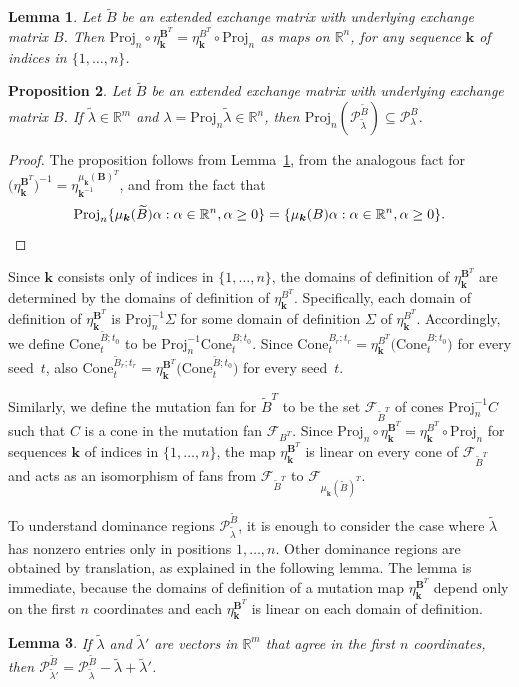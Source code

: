 \documentclass[10pt]{article}
\newtheorem{proposition}{Proposition}[section]
\newtheorem{lemma}[proposition]{Lemma}
\theoremstyle{definition}
\theoremstyle{remark}
\numberwithin{equation}{section}
\newcommand{\reals}{\mathbb R}
\newcommand{\set}[1]{{\lbrace #1 \rbrace}}
\newcommand{\GG}{{\mathbf G}}
\newcommand{\F}{{\mathcal F}}
\newcommand{\0}{{\mathbf{0}}}
\newcommand{\Cone}{\mathrm{Cone}}
\newcommand{\Proj}{\mathrm{Proj}}
\newcommand{\kk}{{\boldsymbol{k}}}
\newcommand{\tB}{{\widetilde{B}}}
\newcommand{\BB}{\mathbf{B}}
\renewcommand{\P}{\mathcal{P}}
\begin{document}
\begin{lemma}\label{eta proj}
Let $\tB$ be an extended exchange matrix with underlying exchange matrix $B$.
Then $\Proj_n\circ\eta_\kk^{\BB^T}=\eta_\kk^{B^T}\circ\Proj_n$ as maps on $\reals^n$, for any sequence $\kk$ of indices in $\set{1,\ldots,n}$.
\end{lemma}

\begin{proposition}\label{contains proj}
Let $\tB$ be an extended exchange matrix with underlying exchange matrix $B$.
  If $\tilde\lambda\in\reals^m$ and $\lambda=\Proj_n\tilde\lambda\in\reals^n$, then $\Proj_n(\P_{\tilde\lambda}^\tB)\subseteq\P_{\lambda}^B$.
\end{proposition}
\begin{proof}
The proposition follows from Lemma~\ref{eta proj}, from the analogous fact for $\bigl(\eta_\kk^{\BB^T}\bigr)^{-1}=\eta_{\kk^{-1}}^{\mu_\kk(\BB)^T}$, and from the fact that 
\[\Proj_n\set{\mu_\kk(\tB)\alpha:\alpha\in\reals^n,\alpha\ge0}=\set{\mu_\kk(B)\alpha:\alpha\in\reals^n,\alpha\ge0}.\qedhere\]
\end{proof}

Since $\kk$ consists only of indices in $\set{1,\ldots,n}$, the domains of definition of $\eta_\kk^{\BB^T}$ are determined by the domains of definition of $\eta_\kk^{B^T}$.
Specifically, each domain of definition of $\eta_\kk^{\BB^T}$ is $\Proj_n^{-1}\Sigma$ for some domain of definition $\Sigma$ of $\eta_\kk^{B^T}$.
Accordingly, we define $\Cone_t^{\tB;t_0}$ to be %
$\Proj_n^{-1}\Cone_t^{B;t_0}$.
Since $\Cone_t^{B_r;t_r}=\eta_\kk^{B^T}\bigl(\Cone_t^{B;t_0}\bigr)$ for every seed~$t$, also $\Cone_t^{\tB_r;t_r}=\eta_\kk^{\BB^T}\bigl(\Cone_t^{\tB;t_0}\bigr)$ for every seed~$t$.

Similarly, we define the mutation fan for $\tB^T$ to be the set $\F_{\tB^T}$ of cones $\Proj_n^{-1}C$ such that $C$ is a cone in the mutation fan $\F_{B^T}$.
Since $\Proj_n\circ\eta_\kk^{\BB^T}=\eta_\kk^{B^T}\circ\Proj_n$ for sequences $\kk$ of indices in $\set{1,\ldots,n}$, the map $\eta_\kk^{\BB^T}$ is linear on every cone of $\F_{\tB^T}$ and acts as an isomorphism of fans from $\F_{\tB^T}$ to $\F_{\mu_\kk(\tB)^T}$.

To understand dominance regions $\P^\tB_{\tilde\lambda}$, it is enough to consider the case where $\tilde\lambda$ has nonzero entries only in positions $1,\ldots,n$.
Other dominance regions are obtained by translation, as explained in the following lemma.
The lemma is immediate, because the domains of definition of a mutation map $\eta_\kk^{\BB^T}$ depend only on the first $n$ coordinates and each $\eta_\kk^{\BB^T}$ is linear on each domain of definition.
\begin{lemma}\label{after all coefficients are just coefficients}
  If $\tilde\lambda$ and $\tilde\lambda'$ are vectors in $\reals^m$ that agree in the first $n$ coordinates, then $\P^\tB_{\tilde\lambda'}=\P^\tB_{\tilde\lambda}-\tilde\lambda+\tilde\lambda'$.
\end{lemma}
\end{document}
